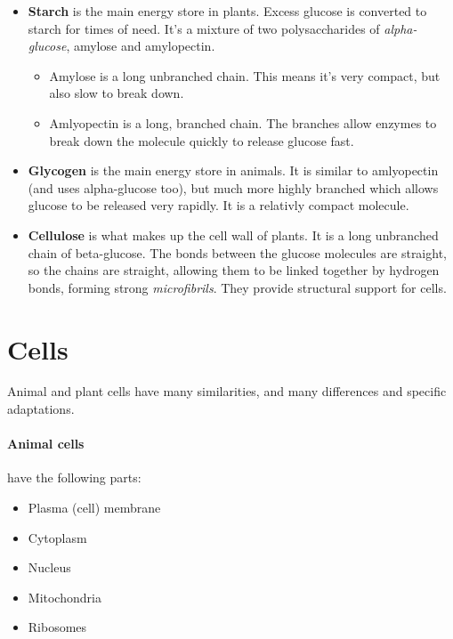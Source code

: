 \documentclass{article}
\begin{document}
\begin{itemize}

	\item {\bf Starch} is the main energy store in plants. Excess glucose is
	converted to starch for times of need. It's a mixture of two
	polysaccharides of {\it alpha-glucose}, amylose and amylopectin.

	\begin{itemize}

		\item Amylose is a long unbranched chain. This means it's very compact,
		but also slow to break down.

		\item Amlyopectin is a long, branched chain. The branches allow enzymes
		to break down the molecule quickly to release glucose fast.

	\end{itemize}

	\item {\bf Glycogen} is the main energy store in animals. It is similar to
	amlyopectin (and uses alpha-glucose too), but much more highly branched
	which allows glucose to be released very rapidly. It is a relativly compact
	molecule.

	\item {\bf Cellulose} is what makes up the cell wall of plants. It is a long
	unbranched chain of beta-glucose. The bonds between the glucose molecules
	are straight, so the chains are straight, allowing them to be linked
	together by hydrogen bonds, forming strong {\it microfibrils}. They provide
	structural support for cells.

\end{itemize}

\section*{Cells}

Animal and plant cells have many similarities, and many differences and specific adaptations.

\paragraph*{Animal cells} have the following parts:

\begin{itemize}

	\item Plasma (cell) membrane

	\item Cytoplasm

	\item Nucleus

	\item Mitochondria

	\item Ribosomes

\end{itemize}
\end{document}
